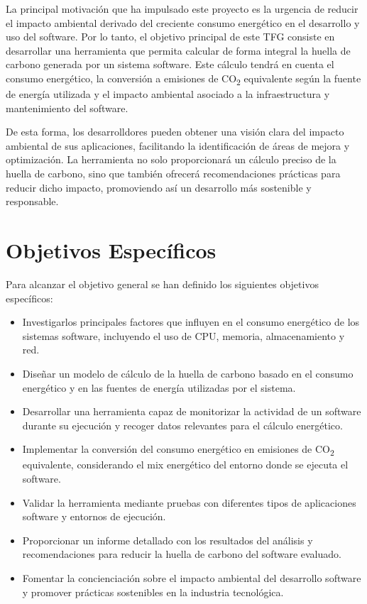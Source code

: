 \documentclass[12pt,a4paper]{report}
\begin{document}
La principal motivación que ha impulsado este proyecto es la urgencia de
reducir el impacto ambiental derivado del creciente consumo energético en el
desarrollo y uso del software. Por lo tanto, el objetivo principal de este TFG
consiste en desarrollar una herramienta que permita calcular de forma integral
la huella de carbono generada por un sistema software. Este cálculo tendrá en
cuenta el consumo energético, la conversión a emisiones de CO\textsubscript{2}
equivalente según la fuente de energía utilizada y el impacto ambiental
asociado a la infraestructura y mantenimiento del software.

De esta forma, los desarrolldores pueden obtener una visión clara del impacto
ambiental de sus aplicaciones, facilitando la identificación de áreas de mejora
y optimización. La herramienta no solo proporcionará un cálculo preciso de la
huella de carbono, sino que también ofrecerá recomendaciones prácticas para
reducir dicho impacto, promoviendo así un desarrollo más sostenible y
responsable.

\section{Objetivos Específicos}

Para alcanzar el objetivo general se han definido los siguientes objetivos
específicos:

\begin{itemize}
  \item Investigarlos principales factores que influyen en el consumo
        energético de los sistemas software, incluyendo el uso de CPU, memoria,
        almacenamiento y red.
  \item Diseñar un modelo de cálculo de la huella de carbono basado en el consumo
        energético y en las fuentes de energía utilizadas por el sistema.
  \item Desarrollar una herramienta capaz de monitorizar la actividad de un software
        durante su ejecución y recoger datos relevantes para el cálculo energético.
  \item Implementar la conversión del consumo energético en emisiones de
        CO\textsubscript{2} equivalente, considerando el mix energético del entorno
        donde se ejecuta el software.
  \item Validar la herramienta mediante pruebas con diferentes tipos de aplicaciones
        software y entornos de ejecución.
  \item Proporcionar un informe detallado con los resultados del análisis y
        recomendaciones para reducir la huella de carbono del software evaluado.
  \item Fomentar la concienciación sobre el impacto ambiental del desarrollo software y
        promover prácticas sostenibles en la industria tecnológica.
\end{itemize}
\end{document}
